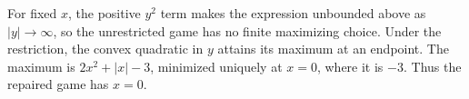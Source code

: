 For fixed $x$, the positive $y^2$ term makes the expression unbounded above as $|y|\to\infty$, so the unrestricted game has no finite maximizing choice. Under the restriction, the convex quadratic in $y$ attains its maximum at an endpoint. The maximum is $2x^2+|x|-3$, minimized uniquely at $x=0$, where it is $\boxed{-3}$. Thus the repaired game has $\boxed{x=0}$.
